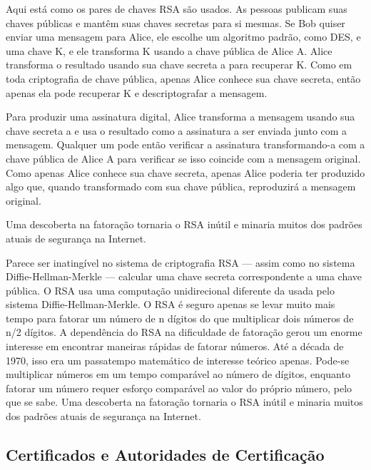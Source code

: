 \documentclass{book}
\begin{document}
Aqui está como os pares de chaves RSA são usados. As pessoas publicam suas chaves públicas e mantêm suas chaves secretas para si mesmas. Se Bob quiser enviar uma mensagem para Alice, ele escolhe um algoritmo padrão, como DES, e uma chave K, e ele transforma K usando a chave pública de Alice A. Alice transforma o resultado usando sua chave secreta a para recuperar K. Como em toda criptografia de chave pública, apenas Alice conhece sua chave secreta, então apenas ela pode recuperar K e descriptografar a mensagem.

Para produzir uma assinatura digital, Alice transforma a mensagem usando sua chave secreta a e usa o resultado como a assinatura a ser enviada junto com a mensagem. Qualquer um pode então verificar a assinatura transformando-a com a chave pública de Alice A para verificar se isso coincide com a mensagem original. Como apenas Alice conhece sua chave secreta, apenas Alice poderia ter produzido algo que, quando transformado com sua chave pública, reproduzirá a mensagem original.

Uma descoberta na fatoração tornaria o RSA inútil e minaria muitos dos padrões atuais de segurança na Internet.

Parece ser inatingível no sistema de criptografia RSA --- assim como no sistema Diffie-Hellman-Merkle --- calcular uma chave secreta correspondente a uma chave pública. O RSA usa uma computação unidirecional diferente da usada pelo sistema Diffie-Hellman-Merkle. O RSA é seguro apenas se levar muito mais tempo para fatorar um número de n dígitos do que multiplicar dois números de n/2 dígitos. A dependência do RSA na dificuldade de fatoração gerou um enorme interesse em encontrar maneiras rápidas de fatorar números. Até a década de 1970, isso era um passatempo matemático de interesse teórico apenas. Pode-se multiplicar números em um tempo comparável ao número de dígitos, enquanto fatorar um número requer esforço comparável ao valor do próprio número, pelo que se sabe. Uma descoberta na fatoração tornaria o RSA inútil e minaria muitos dos padrões atuais de segurança na Internet.


\subsection{Certificados e Autoridades de Certificação}
\label{segredos:certificados-aut-cert}
\end{document}
